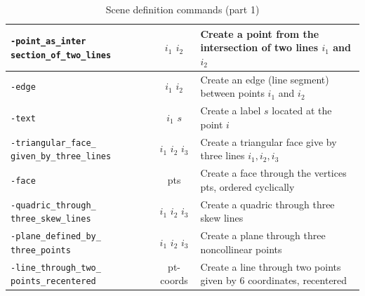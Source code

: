 \begin{table}
\begin{center}
\begin{tabular}{|p{4.5cm}|c|p{8cm}|}
		\hline
		\verb'-point_as_inter' \verb'section_of_two_lines' & $i_1$ $i_2$  & Create a point from the intersection of two lines $i_1$ and $i_2$ \\
		\hline
		\verb'-edge' & $i_1$ $i_2$  & Create an edge (line segment) between points $i_1$ and $i_2$ \\
		\hline
		\verb'-text' & $i_1$ $s$  & Create a label $s$ located at the point $i$  \\
		\hline
		\verb'-triangular_face_' \verb'given_by_three_lines' & $i_1$ $i_2$ $i_3$  & Create a triangular face give by three lines $i_1,i_2,i_3$ \\
		\hline
		\verb'-face' & pts  & Create a face through the vertices pts, ordered cyclically \\
		\hline
		\verb'-quadric_through_' \verb'three_skew_lines' & $i_1$ $i_2$ $i_3$  & Create a quadric through three skew lines \\
		\hline
		\verb'-plane_defined_by_' \verb'three_points' & $i_1$ $i_2$ $i_3$  & Create a plane through three noncollinear points \\
		\hline
		\verb'-line_through_two_' \verb'points_recentered' & pt-coords   & Create a line through two points given by 6 coordinates, recentered \\
		\hline
		\end{tabular}
	\end{center}
	\caption{\label{tab:scene1}Scene definition commands (part 1)}
	\end{table}
